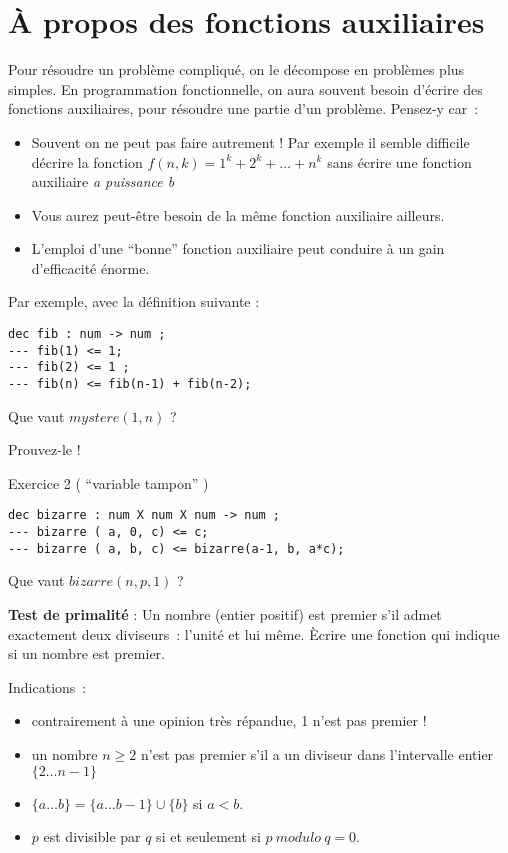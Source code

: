 \section{À propos des fonctions auxiliaires}

Pour résoudre un problème compliqué, on le décompose en problèmes plus
simples. En programmation fonctionnelle, on aura souvent besoin
d'écrire des fonctions auxiliaires, pour résoudre une partie d'un
problème. Pensez-y car~:

\begin{itemize}
\item Souvent on ne peut pas faire autrement ! Par exemple il semble
difficile décrire la fonction $f(n,k) = 1^k + 2^k + \ldots + n^k$ sans
écrire une fonction auxiliaire {\em a puissance b}
\item Vous aurez peut-\^etre besoin de la m\^eme fonction auxiliaire
ailleurs.
\item L'emploi d'une ``bonne'' fonction auxiliaire peut conduire à un
gain d'efficacité énorme.
\end{itemize}


Par exemple, avec la définition suivante :

\begin{verbatim}
dec fib : num -> num ;
--- fib(1) <= 1;
--- fib(2) <= 1 ;
--- fib(n) <= fib(n-1) + fib(n-2);
\end{verbatim}

Que vaut $mystere(1,n)$ ?

\begin{exercice}
Prouvez-le !
\end{exercice}


\begin{exercice}
Exercice 2 ( ``variable tampon'' )
\begin{verbatim}
dec bizarre : num X num X num -> num ;
--- bizarre ( a, 0, c) <= c;
--- bizarre ( a, b, c) <= bizarre(a-1, b, a*c);
\end{verbatim}
Que vaut $bizarre( n, p, 1)$ ? 
 
\end{exercice}


\begin{exercice}
\textbf{Test de primalité} : 
Un nombre (entier positif) est premier s'il admet exactement deux
diviseurs~: l'unité et lui m\^eme. Ècrire une fonction qui indique si
un nombre est premier.

Indications~:
\begin{itemize}
\item contrairement à une opinion très répandue, 1 n'est pas premier !
\item un nombre $ n \geq 2 $ n'est pas premier s'il a un diviseur dans
l'intervalle entier $\{ 2 \ldots n-1 \}$
\item $ \{ a \ldots b \} = \{ a \ldots b-1 \} \cup \{ b \}$ si  $a<b$.
\item $p$ est divisible par $q$ si et seulement si $p\ modulo\ q = 0$.
\end{itemize}

\end{exercice}

